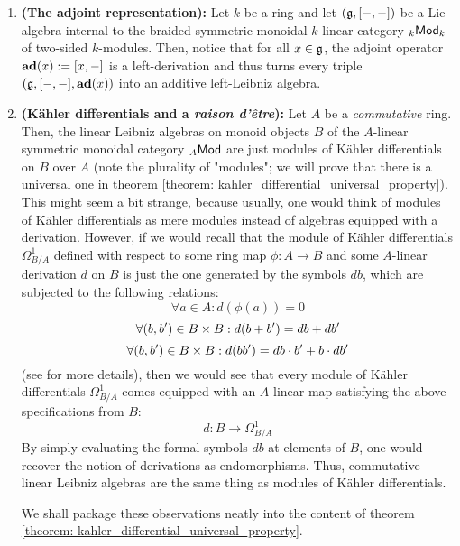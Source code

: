                 \begin{example} \label{example: derivations}
                    \noindent
                    \begin{enumerate}
                        \item \textbf{(The adjoint representation):} Let $k$ be a ring and let $\left(\mathfrak{g}, [-,-]\right)$ be a Lie algebra internal to the braided symmetric monoidal $k$-linear category ${}_k\mathsf{Mod}_k$ of two-sided $k$-modules. Then, notice that for all $x \in \mathfrak{g}$, the adjoint operator $\mathbf{ad}(x) := [x,-]$ is a left-derivation and thus turns every triple $\left(\mathfrak{g}, [-,-], \mathbf{ad}(x)\right)$ into an additive left-Leibniz algebra.
                        \item \textbf{(K\"ahler differentials and a \textit{raison d'\^etre}):} Let $A$ be a \textit{commutative} ring. Then, the linear Leibniz algebras on monoid objects $B$ of the $A$-linear symmetric monoidal category ${}_A\mathsf{Mod}$ are just modules of K\"ahler differentials on $B$ over $A$ (note the plurality of "modules"; we will prove that there is a universal one in theorem \ref{theorem: kahler_differential_universal_property}). This might seem a bit strange, because usually, one would think of modules of K\"ahler differentials as mere modules instead of algebras equipped with a derivation. However, if we would recall that the module of K\"ahler differentials $\Omega^1_{B/A}$ defined with respect to some ring map $\phi: A \to B$ and some $A$-linear derivation $d$ on $B$ is just the one generated by the symbols $db$, which are subjected to the following relations:
                            $$\forall a \in A: d\left(\phi(a)\right) = 0$$
                            $$\forall (b, b') \in B \x B: d(b + b') = db + db'$$
                            $$\forall (b, b') \in B \x B: d(bb') = db \cdot b' + b \cdot db'$$
                        (see \cite[\href{https://stacks.math.columbia.edu/tag/00RM}{Tag 00RM}]{stacks} for more details), then we would see that every module of K\"ahler differentials $\Omega^1_{B/A}$ comes equipped with an $A$-linear map satisfying the above specifications from $B$:
                            $$d: B \to \Omega^1_{B/A}$$
                        By simply evaluating the formal symbols $db$ at elements of $B$, one would recover the notion of derivations as endomorphisms. Thus, commutative linear Leibniz algebras are the same thing as modules of K\"ahler differentials. 
                        
                        We shall package these observations neatly into the content of theorem \ref{theorem: kahler_differential_universal_property}. 
                    \end{enumerate}
                \end{example}
                
